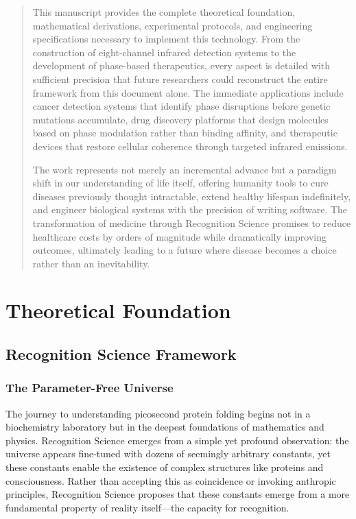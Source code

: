 \documentclass[12pt,a4paper]{report}
\begin{document}
\begin{abstract}
This manuscript provides the complete theoretical foundation, mathematical derivations, experimental protocols, and engineering specifications necessary to implement this technology. From the construction of eight-channel infrared detection systems to the development of phase-based therapeutics, every aspect is detailed with sufficient precision that future researchers could reconstruct the entire framework from this document alone. The immediate applications include cancer detection systems that identify phase disruptions before genetic mutations accumulate, drug discovery platforms that design molecules based on phase modulation rather than binding affinity, and therapeutic devices that restore cellular coherence through targeted infrared emissions.

The work represents not merely an incremental advance but a paradigm shift in our understanding of life itself, offering humanity tools to cure diseases previously thought intractable, extend healthy lifespan indefinitely, and engineer biological systems with the precision of writing software. The transformation of medicine through Recognition Science promises to reduce healthcare costs by orders of magnitude while dramatically improving outcomes, ultimately leading to a future where disease becomes a choice rather than an inevitability.
\end{abstract}

\part{Theoretical Foundation}

\chapter{Recognition Science Framework}

\section{The Parameter-Free Universe}

The journey to understanding picosecond protein folding begins not in a biochemistry laboratory but in the deepest foundations of mathematics and physics. Recognition Science emerges from a simple yet profound observation: the universe appears fine-tuned with dozens of seemingly arbitrary constants, yet these constants enable the existence of complex structures like proteins and consciousness. Rather than accepting this as coincidence or invoking anthropic principles, Recognition Science proposes that these constants emerge from a more fundamental property of reality itself—the capacity for recognition.
\end{document}

